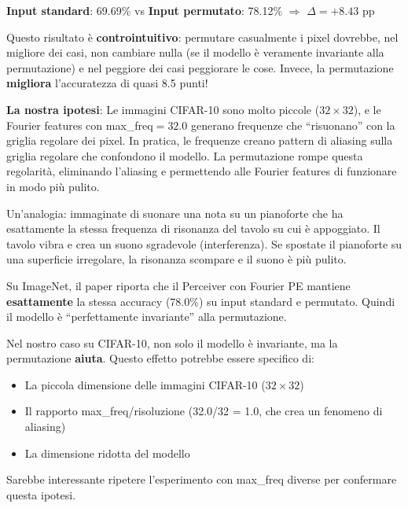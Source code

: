 \documentclass[12pt,a4paper]{article}
\begin{document}
\begin{examplebox}
\textbf{Input standard}: 69.69\% \quad vs \quad \textbf{Input permutato}: 78.12\% \quad $\Rightarrow$ \quad $\Delta = +8.43$ pp

Questo risultato \`e \textbf{controintuitivo}: permutare casualmente i pixel dovrebbe, nel migliore dei casi, non cambiare nulla (se il modello \`e veramente invariante alla permutazione) e nel peggiore dei casi peggiorare le cose. Invece, la permutazione \textbf{migliora} l'accuratezza di quasi 8.5 punti!

\textbf{La nostra ipotesi}: Le immagini CIFAR-10 sono molto piccole ($32 \times 32$), e le Fourier features con max\_freq$=32.0$ generano frequenze che ``risuonano'' con la griglia regolare dei pixel. In pratica, le frequenze creano pattern di aliasing sulla griglia regolare che confondono il modello. La permutazione rompe questa regolarit\`a, eliminando l'aliasing e permettendo alle Fourier features di funzionare in modo pi\`u pulito.

Un'analogia: immaginate di suonare una nota su un pianoforte che ha esattamente la stessa frequenza di risonanza del tavolo su cui \`e appoggiato. Il tavolo vibra e crea un suono sgradevole (interferenza). Se spostate il pianoforte su una superficie irregolare, la risonanza scompare e il suono \`e pi\`u pulito.
\end{examplebox}

\begin{notabox}
Su ImageNet, il paper riporta che il Perceiver con Fourier PE mantiene \textbf{esattamente} la stessa accuracy (78.0\%) su input standard e permutato. Quindi il modello \`e ``perfettamente invariante'' alla permutazione.

Nel nostro caso su CIFAR-10, non solo il modello \`e invariante, ma la permutazione \textbf{aiuta}. Questo effetto potrebbe essere specifico di:
\begin{itemize}
    \item La piccola dimensione delle immagini CIFAR-10 ($32 \times 32$)
    \item Il rapporto max\_freq/risoluzione (32.0/32 = 1.0, che crea un fenomeno di aliasing)
    \item La dimensione ridotta del modello
\end{itemize}
Sarebbe interessante ripetere l'esperimento con max\_freq diverse per confermare questa ipotesi.
\end{notabox}
\end{document}
